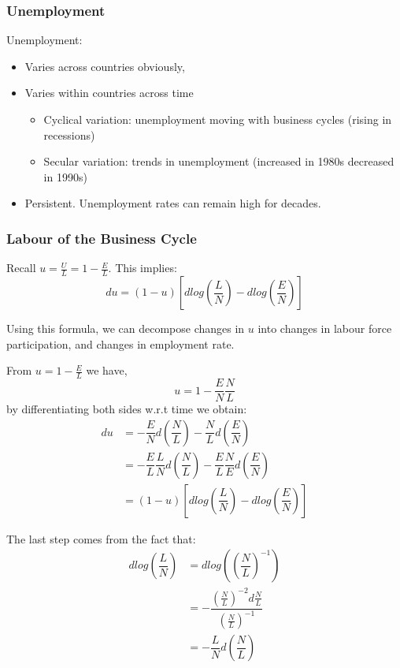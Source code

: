 \documentclass[11pt]{article}
\begin{document}
\subsubsection{Unemployment}

\begin{mdframed}
    Unemployment:
    \begin{itemize}
        \item Varies across countries obviously,
        \item Varies within countries across time
        \begin{itemize}
            \item Cyclical variation: unemployment moving with business cycles (rising in recessions)
            \item Secular variation: trends in unemployment (increased in 1980s decreased in 1990s)
        \end{itemize}
        \item Persistent. Unemployment rates can remain high for decades.
    \end{itemize}
\end{mdframed}

\subsubsection{Labour of the Business Cycle}
Recall $u= \frac{U}{L} = 1-\frac{E}{L}$. This implies:
\[du = (1-u)\left[dlog\left(\dfrac{L}{N}\right) - dlog\left(\dfrac{E}{N}\right)\right]\]

Using this formula, we can decompose changes in $u$ into changes in labour force participation, and changes in employment rate.

\begin{deriv}
From $u = 1-\frac{E}{L}$ we have,
\[u = 1-\dfrac{E}{N}\dfrac{N}{L}\]
by differentiating both sides w.r.t time we obtain:
\begin{align*}
    du &= -\dfrac{E}{N}d\left(\dfrac{N}{L}\right) - \dfrac{N}{L}d\left(\dfrac{E}{N}\right) \\
        &= - \dfrac{E}{L}\dfrac{L}{N}d\left(\dfrac{N}{L}\right) - \dfrac{E}{L}\dfrac{N}{E}d\left(\dfrac{E}{N}\right) \\
        &= (1-u) \left[dlog\left(\dfrac{L}{N}\right) - dlog\left(\dfrac{E}{N}\right)\right]
\end{align*}
\begin{note}
    The last step comes from the fact that:
    \begin{align*}
        dlog\left(\dfrac{L}{N}\right) &= dlog(\left(\dfrac{N}{L}\right)^{-1}) \\
        &= -\dfrac{(\frac{N}{L})^{-2}d\frac{N}{L}}{(\frac{N}{L})^{-1}} \\
        &= -\dfrac{L}{N}d\left(\dfrac{N}{L}\right)
    \end{align*}
\end{note}
\end{deriv}
\end{document}
